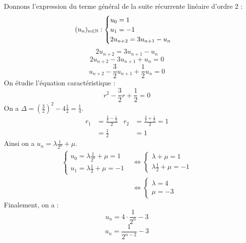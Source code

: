 \begin{example}
	Donnons l'expression du terme général de la suite récurrente linéaire d'ordre 2 :
	\[
	(u_n)_{n \in \mathbb{N}} :
	\begin{cases}
		u_0 = 1 \\
		u_1 = -1 \\
		2u_{n+2} = 3u_{n+1} - u_n
	\end{cases}
	\]
	\[ 2u_{n+2} = 3u_{n+1} - u_n \]
	\[ 2 u_{n+2} - 3 u_{n+1} + u_n = 0 \]
	\[ u_{n+2} - \frac{3}{2} u_{n+1} + \frac{1}{2} u_n = 0 \]
	On étudie l'équation caractéristique :
	\[ r^2 - \frac{3}{2} r + \frac{1}{2} = 0 \]
	On a $\Delta = \left( \frac{3}{2} \right)^2 - 4 \frac{1}{2} = \frac{1}{4}$.
	\begin{align*}
		r_1 &= \frac{\frac{3}{2} - \frac{1}{2}}{2}  & r_2 &= \frac{\frac{3}{2} + \frac{1}{2}}{2} = 1 \\
		&= \frac{1}{2} & &= 1
	\end{align*}
	Ainsi on a $u_n = \lambda \frac{1}{2^n} + \mu$.
	\begin{align*}
		\begin{cases}
			u_0 = \lambda \frac{1}{2^0} + \mu = 1 \\
			u_1 = \lambda \frac{1}{2} + \mu = -1 
		\end{cases}
		&\iff 
		\begin{cases}
			\lambda + \mu = 1 \\
			\lambda \frac{1}{2} + \mu = -1
		\end{cases} \\
		&\iff 
		\begin{cases}
			\lambda = 4 \\
			\mu = -3
		\end{cases}
	\end{align*}
	Finalement, on a :
	\[ u_n = 4 \cdot \frac{1}{2^n} - 3 \]
	\[ u_n = \frac{1}{2^{n-2}} - 3 \]
\end{example}

